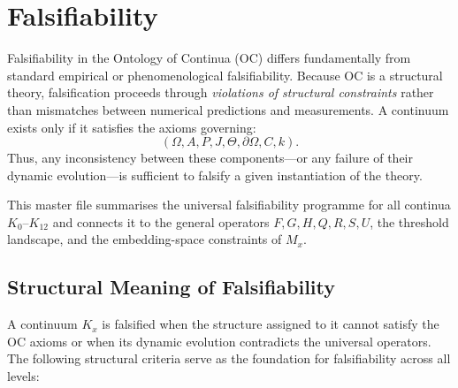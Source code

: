 

\section{Falsifiability}
\label{sec:falsifiability-master}

Falsifiability in the Ontology of Continua (OC) differs fundamentally
from standard empirical or phenomenological falsifiability.
Because OC is a structural theory, falsification proceeds through
\emph{violations of structural constraints} rather than mismatches
between numerical predictions and measurements.
A continuum exists only if it satisfies the axioms governing:
\[
(\Omega, A, P, J, \Theta, \partial\Omega, C, k).
\]
Thus, any inconsistency between these components—or any failure of
their dynamic evolution—is sufficient to falsify a given instantiation
of the theory.

This master file summarises the universal falsifiability programme for
all continua $K_0$–$K_{12}$ and connects it to the general operators 
$F, G, H, Q, R, S, U$, the threshold landscape, and the embedding-space
constraints of $M_x$.



\subsection{Structural Meaning of Falsifiability}

A continuum $K_x$ is falsified when the structure assigned to it
cannot satisfy the OC axioms or when its dynamic evolution contradicts
the universal operators.
The following structural criteria serve as the foundation for
falsifiability across all levels:


